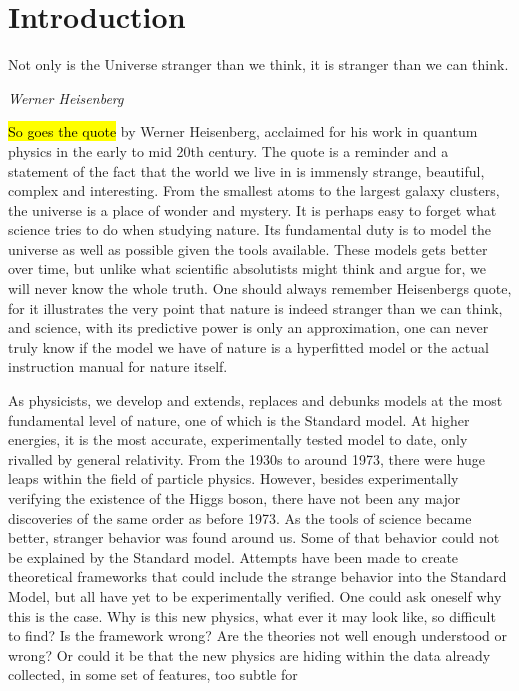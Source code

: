 \chapter*{Introduction}

\epigraph{Not only is the Universe stranger than we think, it is stranger than we can think.}{\textit{Werner Heisenberg}}
\hl{So goes the quote} by Werner Heisenberg, acclaimed for his work in quantum physics in the early to mid 
20th century. The quote is a reminder and a statement of the fact that the world we live in is immensly 
strange, beautiful, complex and interesting. From the smallest atoms to the largest galaxy clusters, 
the universe is a place of wonder and mystery. It is perhaps easy to forget what science tries to do
when studying nature. Its fundamental duty is to model the universe as well as possible given the tools 
available. These models gets better over time, but unlike what scientific absolutists might think and 
argue for, we will never know the whole truth.  One should always remember Heisenbergs quote, for it
illustrates the very point that nature is indeed stranger than we can think, and science, with its 
predictive power is only an approximation, one can never truly know if the model we have of nature is 
a hyperfitted model or the actual instruction manual for nature itself. \par 
As physicists, we develop 
and extends, replaces and debunks models at the most fundamental level of nature, one of which is
the Standard model. At higher energies, it is the most accurate, experimentally tested model to date,
only rivalled by general relativity. From the 1930s to around 1973, there were huge leaps within the field
of particle physics. However, besides experimentally verifying the existence of the Higgs boson,
there have not been any major discoveries of the same order as before 1973. As the tools of science became 
better, stranger behavior was found around us.  Some of that behavior could not be explained by the 
Standard model. Attempts have been made to create theoretical frameworks that could include the strange behavior 
into the Standard Model, but all have yet to be experimentally verified. One could ask oneself why 
this is the case. Why is this new physics, what ever it may look like, so difficult to find? 
Is the framework wrong? Are the theories not well enough understood or wrong? Or could it be that
the new physics are hiding within the data already collected, in some set of features, too subtle for
